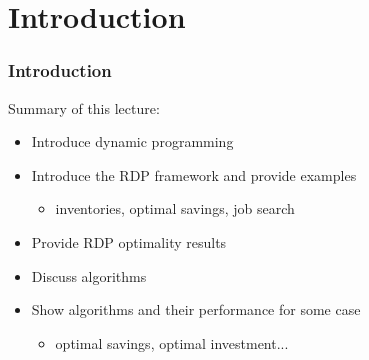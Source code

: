 


\subtitle{Dynamic Programming}

\author{John Stachurski}

\date{September 2022}




\begin{frame}
  \titlepage
\end{frame}


\section{Introduction}


\begin{frame}
    \frametitle{Introduction}

    Summary of this lecture:

    \begin{itemize}
        \item Introduce dynamic programming
            \vspace{0.3em}
            \vspace{0.3em}
        \item Introduce the RDP framework and provide examples
            \vspace{0.3em}
            \vspace{0.3em}
            \begin{itemize}
                \item inventories, optimal savings, job search
            \end{itemize}
            \vspace{0.3em}
            \vspace{0.3em}
        \item Provide RDP optimality results
            \vspace{0.3em}
            \vspace{0.3em}
        \item Discuss algorithms
            \vspace{0.3em}
            \vspace{0.3em}
        \item Show algorithms and their performance for some case
            \vspace{0.3em}
            \vspace{0.3em}
            \begin{itemize}
                \item optimal savings, optimal investment...
            \end{itemize}
    \end{itemize}

            \vspace{0.3em}
            \vspace{0.3em}


\end{frame}





